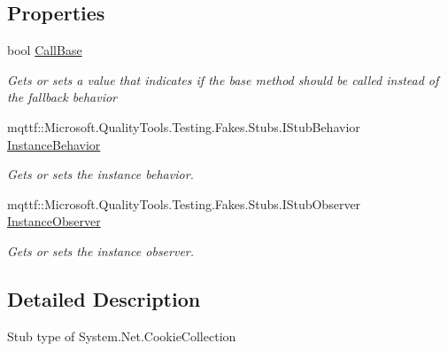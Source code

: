 \subsection*{Properties}
\begin{DoxyCompactItemize}
\item 
bool \hyperlink{class_system_1_1_net_1_1_fakes_1_1_stub_cookie_collection_a32da23bd21ff42d93c3fbcb78d00065d}{Call\-Base}
\begin{DoxyCompactList}\small\item\em Gets or sets a value that indicates if the base method should be called instead of the fallback behavior\end{DoxyCompactList}\item 
mqttf\-::\-Microsoft.\-Quality\-Tools.\-Testing.\-Fakes.\-Stubs.\-I\-Stub\-Behavior \hyperlink{class_system_1_1_net_1_1_fakes_1_1_stub_cookie_collection_ac4af0aa7fdcf96266613478fdea97b8f}{Instance\-Behavior}
\begin{DoxyCompactList}\small\item\em Gets or sets the instance behavior.\end{DoxyCompactList}\item 
mqttf\-::\-Microsoft.\-Quality\-Tools.\-Testing.\-Fakes.\-Stubs.\-I\-Stub\-Observer \hyperlink{class_system_1_1_net_1_1_fakes_1_1_stub_cookie_collection_af2cf97306a87b8083b285aaac441acd6}{Instance\-Observer}
\begin{DoxyCompactList}\small\item\em Gets or sets the instance observer.\end{DoxyCompactList}\end{DoxyCompactItemize}


\subsection{Detailed Description}
Stub type of System.\-Net.\-Cookie\-Collection



